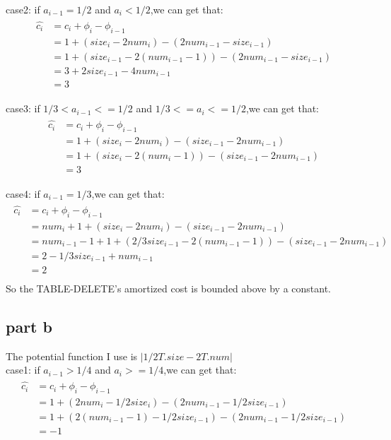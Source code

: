 \documentclass[paper=a4, fontsize=11pt]{scrartcl} %
\numberwithin{equation}{section} %
\numberwithin{figure}{section} %
\numberwithin{table}{section} %
\begin{document}
case2: if $a_{i-1}=1/2$ and $a_i<1/2$,we can get that:
\begin{align*}
\begin{split}
\hat{c_i}&=c_i+\phi_i-\phi_{i-1}\\
         &=1+(size_i-2num_i)-(2num_{i-1}-size_{i-1})\\
         &=1+(size_{i-1}-2(num_{i-1}-1))-(2num_{i-1}-size_{i-1})\\
         &=3+2size_{i-1}-4num_{i-1}\\
         &=3
\end{split}
\end{align*}

case3: if $1/3<a_{i-1}<=1/2$ and $1/3<=a_{i}<=1/2$,we can get that:
\begin{align*}
\begin{split}
\hat{c_i}&=c_i+\phi_i-\phi_{i-1}\\
         &=1+(size_i-2num_i)-(size_{i-1}-2num_{i-1})\\
         &=1+(size_i-2(num_i-1))-(size_{i-1}-2num_{i-1})\\
         &=3
\end{split}
\end{align*}

case4: if $a_{i-1}=1/3$,we can get that:
\begin{align*}
\begin{split}
\hat{c_i}&=c_i+\phi_i-\phi_{i-1}\\
         &=num_i+1+(size_i-2num_i)-(size_{i-1}-2num_{i-1})\\
         &=num_{i-1}-1+1+(2/3size_{i-1}-2(num_{i-1}-1))-(size_{i-1}-2num_{i-1})\\
         &=2-1/3size_{i-1}+num_{i-1}\\
         &=2\\
\end{split}
\end{align*}
So the TABLE-DELETE's amortized cost is bounded above by a constant.

\subsection{\textbf{part b}}
The potential function I use is $|1/2T.size-2T.num|$\\
case1: if $a_{i-1}>1/4$ and $a_i>=1/4$,we can get that:
\begin{align*}
\begin{split}
\hat{c_i}&=c_i+\phi_i-\phi_{i-1}\\
         &=1+(2num_i-1/2size_i)-(2num_{i-1}-1/2size_{i-1})\\
         &=1+(2(num_{i-1}-1)-1/2size_{i-1})-(2num_{i-1}-1/2size_{i-1})\\
         &=-1
\end{split}
\end{align*}
\end{document}
